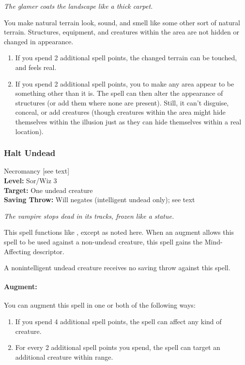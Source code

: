 \emph{The glamer coats the landscape like a thick carpet.}

You make natural terrain look, sound, and smell like some other sort of natural terrain. 
Structures, equipment, and creatures within the area are not hidden or changed in appearance.

\begin{enumerate}
 \item If you spend 2 additional spell points, the changed terrain can be touched, and feels real.
 \item If you spend 2 additional spell points, you to make any area appear to be something other than it is. 
The spell can then alter the appearance of structures (or add them where none are present).
Still, it can't disguise, conceal, or add creatures 
(though creatures within the area might hide themselves within the illusion just as they can hide themselves within a real location).
\end{enumerate}
\subsubsection{Halt Undead}
\label{Spell:HaltUndead}
Necromancy [see text]
\\ \textbf{Level:} Sor/Wiz 3
\\ \textbf{Target:} One undead creature
\\ \textbf{Saving Throw:} Will negates (intelligent undead only); see text

\emph{The vampire stops dead in its tracks, frozen like a statue.}

This spell functions like , except as noted here.
When an augment allows this spell to be used against a non-undead creature, this spell gains the Mind-Affecting descriptor.

A nonintelligent undead creature receives no saving throw against this spell.

\paragraph{Augment:} You can augment this spell in one or both of the following ways:
\begin{enumerate}
 \item If you spend 4 additional spell points, the spell can affect any kind of creature.
 \item For every 2 additional spell points you spend, the spell can target an additional creature within range.
\end{enumerate}
